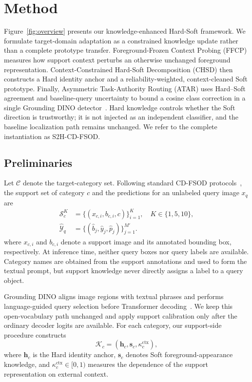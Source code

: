 

\section{Method}
\label{sec:method}

Figure~\ref{fig:overview} presents our knowledge-enhanced Hard-Soft framework. We formulate target-domain adaptation as a constrained knowledge update rather than a complete prototype transfer. Foreground-Frozen Context Probing (FFCP) measures how support context perturbs an otherwise unchanged foreground representation. Context-Constrained Hard-Soft Decomposition (CHSD) then constructs a Hard identity anchor and a reliability-weighted, context-cleaned Soft prototype. Finally, Asymmetric Task-Authority Routing (ATAR) uses Hard--Soft agreement and baseline-query uncertainty to bound a cosine class correction in a single Grounding DINO detector~\cite{groundingdino}. Hard knowledge controls whether the Soft direction is trustworthy; it is not injected as an independent classifier, and the baseline localization path remains unchanged. We refer to the complete instantiation as S2H-CD-FSOD.

\subsection{Preliminaries}
\label{sec:preliminaries}

Let $\mathcal C$ denote the target-category set. Following standard CD-FSOD protocols~\cite{cdvito,yu2026}, the support set of category $c$ and the predictions for an unlabeled query image $x_q$ are
\begin{equation}
\begin{aligned}
\mathcal S_c^K
&=\{(x_{c,i},b_{c,i},c)\}_{i=1}^{K},
\quad K\in\{1,5,10\},\\
\widehat{\mathcal Y}_q
&=\{(\hat b_j,\hat y_j,\hat p_j)\}_{j=1}^{M'}.
\end{aligned}
\label{eq:problem}
\end{equation}
where $x_{c,i}$ and $b_{c,i}$ denote a support image and its annotated bounding box, respectively. At inference time, neither query boxes nor query labels are available. Category names are obtained from the support annotations and used to form the textual prompt, but support knowledge never directly assigns a label to a query object.

Grounding DINO aligns image regions with textual phrases and performs language-guided query selection before Transformer decoding~\cite{groundingdino}. We keep this open-vocabulary path unchanged and apply support calibration only after the ordinary decoder logits are available. For each category, our support-side procedure constructs
\begin{equation}
\mathcal K_c=(\mathbf h_c,\mathbf s_c,
\kappa_c^{\mathrm{ctx}}),
\label{eq:knowledge_cache}
\end{equation}
where $\mathbf h_c$ is the Hard identity anchor, $\mathbf s_c$ denotes Soft foreground-appearance knowledge, and $\kappa_c^{\mathrm{ctx}}\in[0,1)$ measures the dependence of the support representation on external context.

